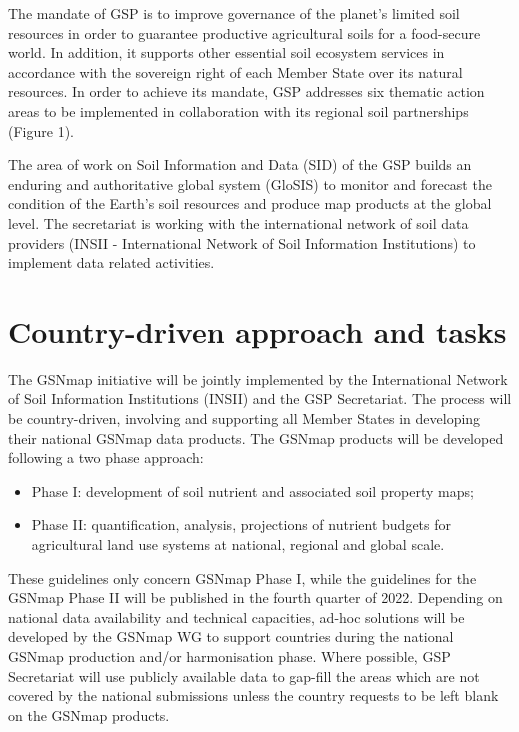 \documentclass[
  10pt,
  b5paper,
  oneside]{book}
\providecommand{\tightlist}{%
  \setlength{\itemsep}{0pt}\setlength{\parskip}{0pt}}
\begin{document}
The mandate of GSP is to improve governance of the planet's limited soil resources in order to guarantee productive agricultural soils for a food-secure world. In addition, it supports other essential soil ecosystem services in accordance with the sovereign right of each Member State over its natural resources. In order to achieve its mandate, GSP addresses six thematic action areas to be implemented in collaboration with its regional soil partnerships (Figure 1).

The area of work on Soil Information and Data (SID) of the GSP builds an enduring and authoritative global system (GloSIS) to monitor and forecast the condition of the Earth's soil resources and produce map products at the global level. The secretariat is working with the international network of soil data providers (INSII - International Network of Soil Information Institutions) to implement data related activities.

\hypertarget{country-driven-approach-and-tasks}{%
\section{Country-driven approach and tasks}\label{country-driven-approach-and-tasks}}

The GSNmap initiative will be jointly implemented by the International Network of Soil Information Institutions (INSII) and the GSP Secretariat. The process will be country-driven, involving and supporting all Member States in developing their national GSNmap data products. The GSNmap products will be developed following a two phase approach:

\begin{itemize}
\tightlist
\item
  Phase I: development of soil nutrient and associated soil property maps;
\item
  Phase II: quantification, analysis, projections of nutrient budgets for agricultural land use systems at national, regional and global scale.
\end{itemize}

These guidelines only concern GSNmap Phase I, while the guidelines for the GSNmap Phase II will be published in the fourth quarter of 2022.
Depending on national data availability and technical capacities, ad-hoc solutions will be developed by the GSNmap WG to support countries during the national GSNmap production and/or harmonisation phase. Where possible, GSP Secretariat will use publicly available data to gap-fill the areas which are not covered by the national submissions unless the country requests to be left blank on the GSNmap products.
\end{document}
